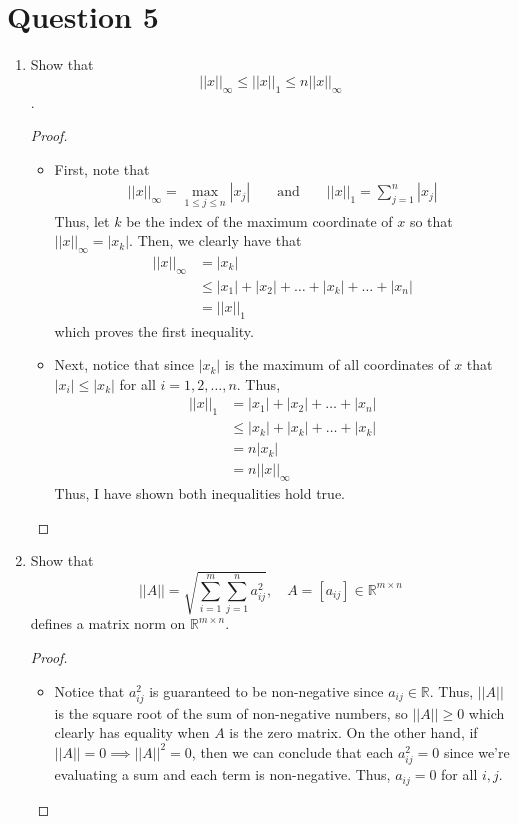 \documentclass[10pt,a4paper]{article}
\theoremstyle{definition}
\theoremstyle{definition}
\numberwithin{equation}{section}
\begin{document}
\section*{Question 5}
\begin{enumerate}[label = (\alph*)]
\item Show that $$||x||_\infty \leq ||x||_1 \leq n ||x||_\infty$$.
	\begin{proof}$ $
	\begin{itemize}
	\item First, note that 
	\begin{align*}
	||x||_\infty = \max_{1 \leq j \leq n} |x_j| && \text{ and } && ||x||_1 = \sum_{j = 1}^n |x_j|
	\end{align*}
	Thus, let $k$ be the index of the maximum coordinate of $x$ so that $||x||_\infty = |x_k|$. Then, we clearly have that 
	\begin{align*}
	||x||_\infty &= |x_k|\\
	&\leq |x_1| + |x_2| + \ldots + |x_k| + \ldots + |x_n|\\
	&= ||x||_1
	\end{align*}
	which proves the first inequality. 
	\item Next, notice that since $|x_k|$ is the maximum of all coordinates of $x$ that $|x_i| \leq |x_k|$ for all $i = 1, 2, \ldots, n$. Thus, 
	\begin{align*}
	||x||_1 &= |x_1| + |x_2| + \ldots + |x_n|\\
	&\leq |x_k| + |x_k| + \ldots + |x_k|\\
	&= n|x_k|\\
	&= n||x||_\infty
	\end{align*}
	Thus, I have shown both inequalities hold true. 
	\end{itemize}
	\end{proof}
\item Show that 
$$
||A|| = \sqrt{\sum_{i = 1}^m \sum_{j = 1}^n a_{ij}^2}, \quad A = [a_{ij}] \in \mathbb{R}^{m \times n}
$$
defines a matrix norm on $\mathbb{R}^{m \times n}$.
\begin{proof}$ $
	\begin{itemize}
	\item Notice that $a_{ij}^2$ is guaranteed to be non-negative since $a_{ij} \in \mathbb{R}$. Thus, $||A||$ is the square root of the sum of non-negative numbers, so $||A|| \geq 0$ which clearly has equality when $A$ is the zero matrix. On the other hand, if $||A|| = 0 \implies ||A||^2 = 0$, then we can conclude that each $a_{ij}^2 = 0$ since we're evaluating a sum and each term is non-negative. Thus, $a_{ij} = 0$ for all $i, j$. 

\end{itemize}
\end{proof}
\end{enumerate}
\end{document}
